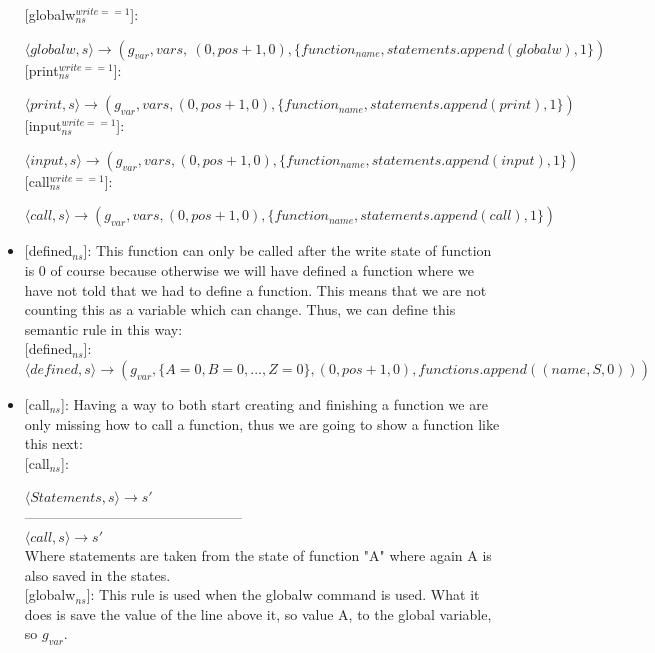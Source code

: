 \documentclass{article}
\begin{document}
\begin{itemize}
{[globalw$_{ns}^{write==1}$]}:

$\langle globalw, s \rangle \rightarrow (g_{var},vars,\ (0,pos+1,0),\{function_{name},statements.append(globalw),1\})$\\

{[print$_{ns}^{write==1}$]}:

$\langle print, s \rangle \rightarrow (g_{var},vars, (0,pos+1,0),\{function_{name},statements.append(print),1\})$\\

{[input$_{ns}^{write==1}$]}:

$\langle input, s \rangle \rightarrow (g_{var},vars, (0,pos+1,0),\{function_{name},statements.append(input),1\})$\\

{[call$_{ns}^{write==1}$]}:

$\langle call, s \rangle \rightarrow (g_{var},vars, (0,pos+1,0),\{function_{name},statements.append(call),1\})$\\

\item {[defined$_{ns}$]}:
This function can only be called after the write state of function is 0 of course because otherwise we will have defined a function where we have not told that we had to define a function. This means that we are not counting this as a variable which can change. Thus, we can define this semantic rule in this way:\\

{[defined$_{ns}$]}: $\langle defined, s \rangle \rightarrow (g_{var},\{A=0,B=0,...,Z=0\}, (0,pos+1,0), functions.append((name,S,0)))$\\
\fi
\item {[call$_{ns}$]}:
Having a way to both start creating and finishing a function we are only missing how to call a function, thus we are going to show a function like this next:\\

{[call$_{ns}$]}: 

$\langle Statements, s \rangle \rightarrow s'$\\
-----------------------------------------------\\
$\langle call,s \rangle \rightarrow s'$\\

Where statements are taken from the state of function "A" where again A is also saved in the states.\\

{[globalw$_{ns}$]}: This rule is used when the globalw command is used. What it does is save the value of the line above it, so value A, to the global variable, so $g_{var}$.


\end{itemize}
\end{document}
